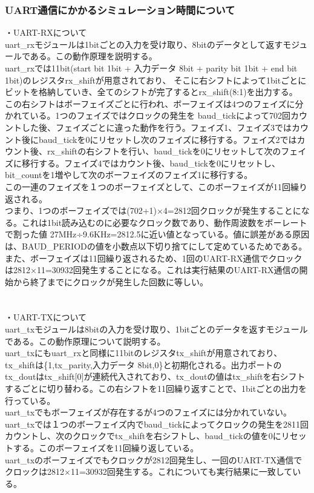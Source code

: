 \documentclass{jsarticle}
\begin{document}
\subsubsection*{UART通信にかかるシミュレーション時間について}
・UART-RXについて \\
uart\_rxモジュールは1bitごとの入力を受け取り、8bitのデータとして返すモジュールである。この動作原理を説明する。 \\
uart\_rxでは11bit(start bit 1bit + 入力データ 8bit + parity bit 1bit + end bit 1bit)のレジスタrx\_shiftが用意されており、
そこに右シフトによって1bitごとにビットを格納していき、全てのシフトが完了するとrx\_shift(8:1)を出力する。 \\
この右シフトはボーフェイズごとに行われ、ボーフェイズは4つのフェイズに分かれている。1つのフェイズではクロックの発生を
baud\_tickによって702回カウントした後、フェイズごとに違った動作を行う。フェイズ1、フェイズ3ではカウント後にbaud\_tickを0にリセットし次のフェイズに移行する。フェイズ2ではカウント後、rx\_shiftの右シフトを行い、baud\_tickを0にリセットして次のフェイズに移行する。フェイズ4ではカウント後、baud\_tickを0にリセットし、bit\_countを1増やして次のボーフェイズのフェイズ1に移行する。 \\
この一連のフェイズを１つのボーフェイズとして、このボーフェイズが11回繰り返される。 \\
つまり、1つのボーフェイズでは(702+1)×4=2812回クロックが発生することになる。これは1bit読み込むのに必要なクロック数であり、動作周波数をボーレートで割った値 27MHz÷9.6KHz=2812.5に近い値となっている。値に誤差がある原因は、BAUD\_PERIODの値を小数点以下切り捨てにして定めているためである。
また、ボーフェイズは11回繰り返されるため、1回のUART-RX通信でクロックは2812×11=30932回発生することになる。これは実行結果のUART-RX通信の開始から終了までにクロックが発生した回数に等しい。 \\
\\
\\
・UART-TXについて \\
uart\_txモジュールは8bitの入力を受け取り、1bitごとのデータを返すモジュールである。この動作原理について説明する。 \\
uart\_txにもuart\_rxと同様に11bitのレジスタtx\_shiftが用意されており、tx\_shiftは\{1,tx\_parity,入力データ 8bit,0\}と初期化される。出力ポートのtx\_doutはtx\_shift[0]が連続代入されており、tx\_doutの値はtx\_shiftを右シフトするごとに切り替わる。この右シフトを11回繰り返すことで、1bitごとの出力を行っている。 \\
uart\_txでもボーフェイズが存在するが4つのフェイズには分かれていない。uart\_txでは１つのボーフェイズ内でbaud\_tickによってクロックの発生を2811回カウントし、次のクロックでtx\_shiftを右シフトし、baud\_tickの値を0にリセットする。このボーフェイズを11回繰り返している。 \\
uart\_txのボーフェイズでもクロックが2812回発生し、一回のUART-TX通信でクロックは2812×11=30932回発生する。これについても実行結果に一致している。
\end{document}
